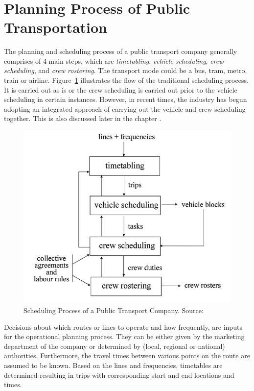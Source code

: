 \documentclass[12pt, oneside]{report}
\begin{document}
\section{Planning Process of Public Transportation}

\paragraph{ } The planning and scheduling process of a public transport company generally comprises of 4 main steps, which are \textit{timetabling}, \textit{vehicle scheduling}, \textit{crew scheduling}, and \textit{crew rostering}. The transport mode could be a bus, tram, metro, train or airline. Figure~\ref{image-genericSchedulingProcess} illustrates the flow of the traditional scheduling process. It is carried out as is or the crew scheduling is carried out prior to the vehicle scheduling in certain instances. However, in recent times, the industry has begun adopting an integrated approach of carrying out the vehicle and crew scheduling together. This is also discussed later in the chapter \citep{Huisman2004}.

\begin {figure} [h!]
\centering
\includegraphics {genericSchedulingProcess}
\caption [Scheduling Process of a Public Transport Company] {Scheduling Process of a Public Transport Company. Source: \citep{Huisman2004}}
\label {image-genericSchedulingProcess}
\end {figure}

Decisions about which routes or lines to operate and how frequently, are inputs for the operational planning process. They can be either given by the marketing department of the company or determined by (local, regional or national) authorities. Furthermore, the travel times between various points on the route are assumed to be known. Based on the lines and frequencies, timetables are determined resulting in trips with corresponding start and end locations and times.
\end{document}
